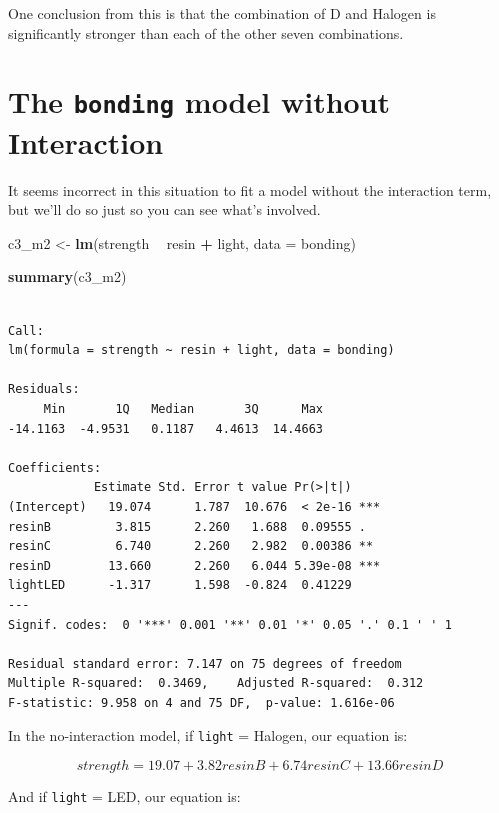 \documentclass[]{book}
\newenvironment{Shaded}{\begin{snugshade}}{\end{snugshade}}
\newcommand{\KeywordTok}[1]{\textcolor[rgb]{0.13,0.29,0.53}{\textbf{#1}}}
\newcommand{\DataTypeTok}[1]{\textcolor[rgb]{0.13,0.29,0.53}{#1}}
\newcommand{\StringTok}[1]{\textcolor[rgb]{0.31,0.60,0.02}{#1}}
\newcommand{\OperatorTok}[1]{\textcolor[rgb]{0.81,0.36,0.00}{\textbf{#1}}}
\newcommand{\NormalTok}[1]{#1}
\theoremstyle{definition}
\theoremstyle{definition}
\theoremstyle{definition}
\theoremstyle{remark}
\begin{document}
One conclusion from this is that the combination of D and Halogen is
significantly stronger than each of the other seven combinations.

\section{\texorpdfstring{The \texttt{bonding} model without
Interaction}{The bonding model without Interaction}}\label{the-bonding-model-without-interaction}

It seems incorrect in this situation to fit a model without the
interaction term, but we'll do so just so you can see what's involved.

\begin{Shaded}
\begin{Highlighting}[]
\NormalTok{c3_m2 <-}\StringTok{ }\KeywordTok{lm}\NormalTok{(strength }\OperatorTok{~}\StringTok{ }\NormalTok{resin }\OperatorTok{+}\StringTok{ }\NormalTok{light, }\DataTypeTok{data =}\NormalTok{ bonding)}

\KeywordTok{summary}\NormalTok{(c3_m2)}
\end{Highlighting}
\end{Shaded}

\begin{verbatim}

Call:
lm(formula = strength ~ resin + light, data = bonding)

Residuals:
     Min       1Q   Median       3Q      Max 
-14.1163  -4.9531   0.1187   4.4613  14.4663 

Coefficients:
            Estimate Std. Error t value Pr(>|t|)    
(Intercept)   19.074      1.787  10.676  < 2e-16 ***
resinB         3.815      2.260   1.688  0.09555 .  
resinC         6.740      2.260   2.982  0.00386 ** 
resinD        13.660      2.260   6.044 5.39e-08 ***
lightLED      -1.317      1.598  -0.824  0.41229    
---
Signif. codes:  0 '***' 0.001 '**' 0.01 '*' 0.05 '.' 0.1 ' ' 1

Residual standard error: 7.147 on 75 degrees of freedom
Multiple R-squared:  0.3469,    Adjusted R-squared:  0.312 
F-statistic: 9.958 on 4 and 75 DF,  p-value: 1.616e-06
\end{verbatim}

In the no-interaction model, if \texttt{light} = Halogen, our equation
is:

\[
strength = 19.07 + 3.82 resinB + 6.74 resinC + 13.66 resinD
\]

And if \texttt{light} = LED, our equation is:
\end{document}
